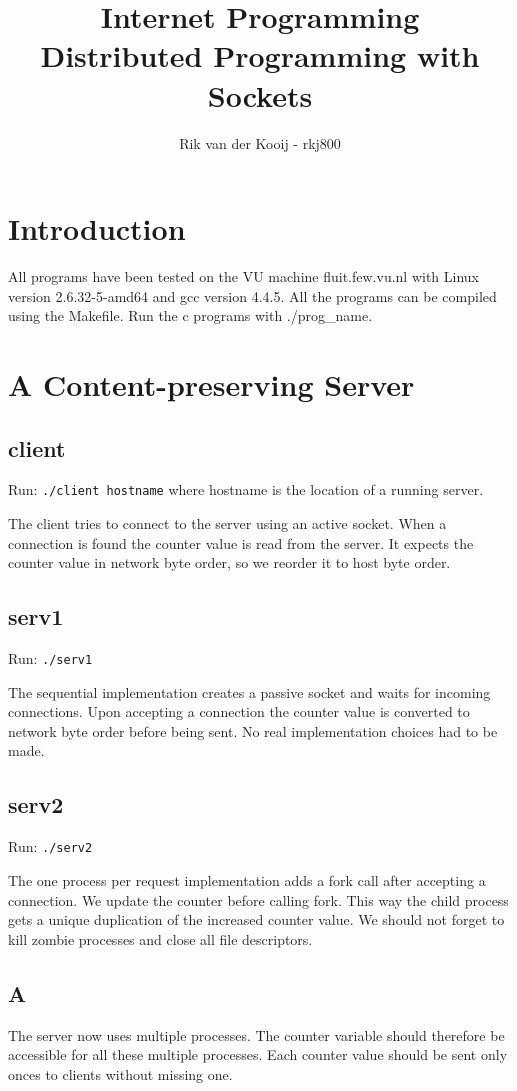 \documentclass[10pt,a4paper]{article}
\title{Internet Programming\\Distributed Programming with Sockets}
\author{Rik van der Kooij - rkj800}
\begin{document}
\maketitle

\section{Introduction}
All programs have been tested on the VU machine fluit.few.vu.nl with Linux version 2.6.32-5-amd64 and gcc version 4.4.5. All the programs can be compiled using the Makefile. Run the c programs with ./prog\_name.

\section{A Content-preserving Server}
\subsection{client}
Run: \texttt{./client hostname} where hostname is the location of a running server.

The client tries to connect to the server using an active socket. When a connection is found the counter value is read from the server. It expects the counter value in network byte order, so we reorder it to host byte order.

\subsection{serv1}
Run: \texttt{./serv1}

The sequential implementation creates a passive socket and waits for incoming connections. Upon accepting a connection the counter value is converted to network byte order before being sent. No real implementation choices had to be made.

\subsection{serv2}
Run: \texttt{./serv2}

The one process per request implementation adds a fork call after accepting a connection. We update the counter before calling fork. This way the child process gets a unique duplication of the increased counter value. We should not forget to kill zombie processes and close all file descriptors. 

\subsection{A}
The server now uses multiple processes. The counter variable should therefore be accessible for all these multiple processes. Each counter value should be sent only onces to clients without missing one. 
\end{document}
